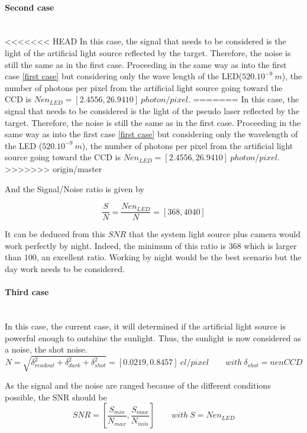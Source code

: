 \paragraph*{Second case}
~~\\
<<<<<<< HEAD
In this case, the signal that needs to be considered is the light of the artificial light source reflected by the target. Therefore, the noise is still the same as in the first case.
Proceeding in the same way as into the first case \ref{first case} but considering only the wave length of the LED($520.10^{-9}\ m$), the number of photons per pixel from the artificial light source going toward the CCD is $Nen_{LED} = [2.4556, 26.9410]\ photon/pixel$.
=======
In this case, the signal that needs to be considered is the light of the pseudo laser reflected by the target. Therefore, the noise is still the same as in the first case.
Proceeding in the same way as into the first case \ref{first case} but considering only the wavelength of the LED ($520.10^{-9}\ m$), the number of photons per pixel from the artificial light source going toward the CCD is $Nen_{LED} = [2.4556, 26.9410]\ photon/pixel$.
>>>>>>> origin/master

And the Signal/Noise ratio is given by

\begin{equation}
\label{eq:Signal Noise Ratio case2}
\frac{S}{N} = \frac{Nen_{LED}}{N} = [368, 4040]
\end{equation}

It can be deduced from this $SNR$ that the system light source plus camera would work perfectly by night. Indeed, the minimum of this ratio is $368$ which is larger than $100$, an excellent ratio. Working by night would be the best scenario but the day work needs to be considered.


\paragraph*{Third case} \label{thirdcase}
~~\\
In this case, the current case, it will determined if the artificial light source is powerful enough to outshine the sunlight. Thus, the sunlight is now considered as a noise, the shot noise. 
\begin{equation}
\label{eq:Noise case3}
N = \sqrt{\delta_{readout}^2+\delta_{dark}^2+\delta_{shot}^2} = [0.0219, 0.8457]\ el/pixel \qquad with\ \delta_{shot} = nenCCD
\end{equation}


As the signal and the noise are ranged because of the different conditions possible, the SNR should be 
\begin{equation*}
SNR = \left[\frac{S_{min}}{N_{max}}, \frac{S_{max}}{N_{min}}\right] \qquad with\ S=Nen_{LED}
\end{equation*}

